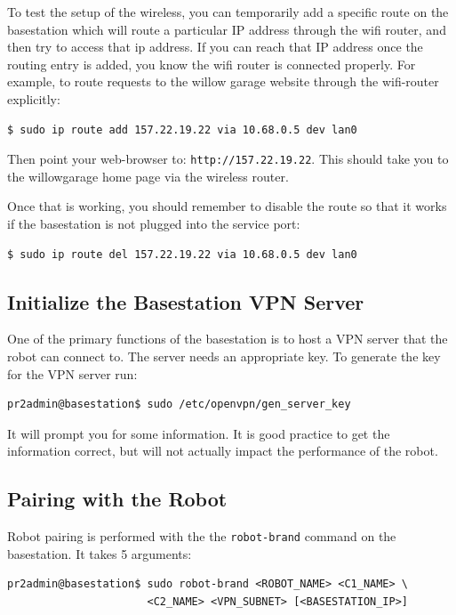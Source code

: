 To test the setup of the wireless, you can temporarily add a specific
route on the basestation which will route a particular IP address
through the wifi router, and then try to access that ip address.  If
you can reach that IP address once the routing entry is added, you
know the wifi router is connected properly.  For example, to route
requests to the willow garage website through the wifi-router
explicitly:
\begin{verbatim}
$ sudo ip route add 157.22.19.22 via 10.68.0.5 dev lan0
\end{verbatim}
Then point your web-browser to: \texttt{http://157.22.19.22}. This
should take you to the willowgarage home page via the wireless router.

Once that is working, you should remember to disable the route so that
it works if the basestation is not plugged into the service port:
\begin{verbatim}
$ sudo ip route del 157.22.19.22 via 10.68.0.5 dev lan0
\end{verbatim}

\subsection{Initialize the Basestation VPN Server}
One of the primary functions of the basestation is to host a VPN
server that the robot can connect to.  The server needs an appropriate
key.  To generate the key for the VPN server run:

\begin{verbatim}
pr2admin@basestation$ sudo /etc/openvpn/gen_server_key
\end{verbatim}

It will prompt you for some information.  It is good practice to get
the information correct, but will not actually impact the performance
of the robot.

\subsection{Pairing with the Robot}

Robot pairing is performed with the the \texttt{robot-brand} command
on the basestation.  It takes 5 arguments:

\begin{verbatim}
pr2admin@basestation$ sudo robot-brand <ROBOT_NAME> <C1_NAME> \
                      <C2_NAME> <VPN_SUBNET> [<BASESTATION_IP>]
\end{verbatim}

